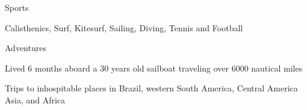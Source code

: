 

\begin{cventries}

\cventry
{} %
{Sports} %
{} %
{} %
{ %
\begin{cvitems}
\vspace{-0.5cm}
\item{Calisthenics, Surf, Kitesurf, Sailing, Diving, Tennis and Football}
\end{cvitems}
}

\vspace{-0.2cm}
\cventry
{} %
{Adventures} 
{} %
{} %
{ 
\begin{cvitems}
\vspace{-0.5cm}
\item {Lived 6 months aboard a 30 years old sailboat traveling over 6000 nautical miles}
\item {Trips to inhospitable places in Brazil, western South America, Central America Asia, and Africa}
\end{cvitems}
}



\end{cventries}